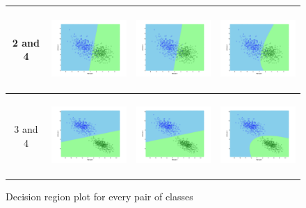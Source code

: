 \documentclass[a4paper]{article}
\begin{document}
\begin{figure}
\begin{tabular}{|c|c|c|c|}
				\hline
				2 and
				4&\includegraphics[width=40mm,height=30mm]{bayes/over/pair/24/all_cov.png}&\includegraphics[width=40mm,height=30mm]{bayes/over/pair/24/avg_cov.png}
				&\includegraphics[width=40mm,height=30mm]{bayes/over/pair/24/diff_cov.png}\\
				\hline
				3 and
				4&\includegraphics[width=40mm,height=30mm]{bayes/over/pair/34/all_cov.png}&\includegraphics[width=40mm,height=30mm]{bayes/over/pair/34/avg_cov.png}
				&\includegraphics[width=40mm,height=30mm]{bayes/over/pair/34/diff_cov.png}\\
				\hline
				
			\end{tabular}
			\caption{Decision region plot for every pair of classes}
			\end{figure}
		
\end{document}
